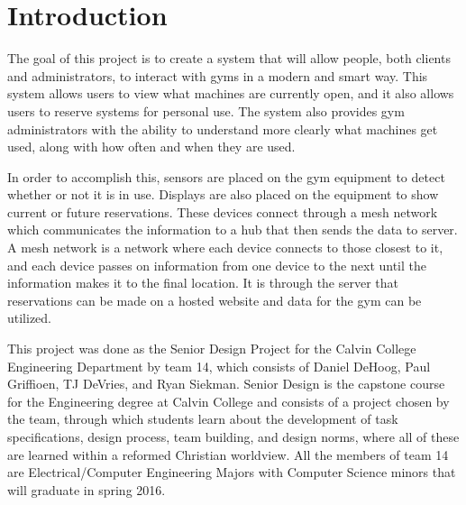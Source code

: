 \documentclass[PPFS.tex]{template/subfiles}
\begin{document}
\section{Introduction}

The goal of this project is to create a system that will allow people, both clients and administrators, to interact with gyms in a modern and smart way. This system allows users to view what machines are currently open, and it also allows users to reserve systems for personal use. The system also provides gym administrators with the ability to understand more clearly what machines get used, along with how often and when they are used.

In order to accomplish this, sensors are placed on the gym equipment to detect whether or not it is in use. Displays are also placed on the equipment to show current or future reservations. These devices connect through a mesh network which communicates the information to a hub that then sends the data to server. A mesh network is a network where each device connects to those closest to it, and each device passes on information from one device to the next until the information makes it to the final location. It is through the server that reservations can be made on a hosted website and data for the gym can be utilized.

This project was done as the Senior Design Project for the Calvin College Engineering Department by team 14, which consists of Daniel DeHoog, Paul Griffioen, TJ DeVries, and Ryan Siekman. Senior Design is the capstone course for the Engineering degree at Calvin College and consists of a project chosen by the team, through which students learn about the development of task specifications, design process, team building, and design norms, where all of these are learned within a reformed Christian worldview. All the members of team 14 are Electrical/Computer Engineering Majors with Computer Science minors that will graduate in spring 2016.
\end{document}
